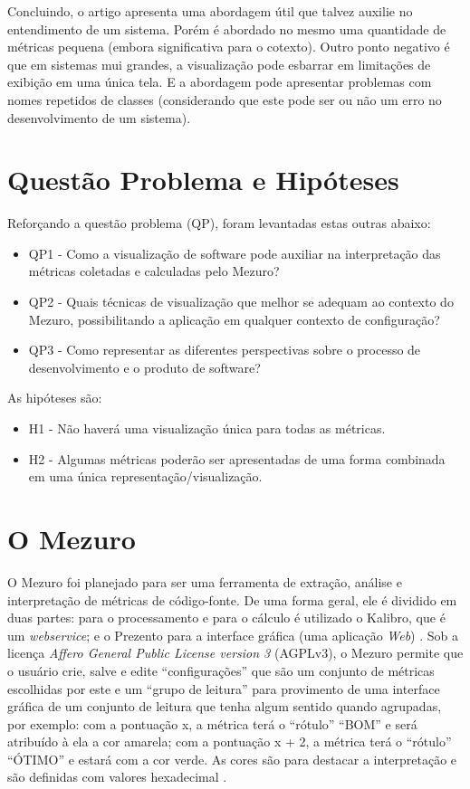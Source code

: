 Concluindo, o artigo apresenta uma abordagem útil que talvez auxilie no
entendimento de um sistema. Porém é abordado no mesmo uma quantidade de
métricas pequena (embora significativa para o cotexto). Outro ponto negativo é
que em sistemas mui grandes, a visualização pode esbarrar em limitações de
exibição em uma única tela. E a abordagem pode apresentar problemas com nomes
repetidos de classes (considerando que este pode ser ou não um erro no
desenvolvimento de um sistema).

\section{Questão Problema e Hipóteses}

Reforçando a questão problema (QP), foram levantadas estas outras abaixo:

\begin{itemize}
  \item QP1 - Como a visualização de software pode auxiliar na
  interpretação das métricas coletadas e calculadas pelo Mezuro?
  \item QP2 - Quais técnicas de visualização que melhor se adequam ao
  contexto do Mezuro, possibilitando a aplicação em qualquer contexto de
  configuração?
  \item QP3 - Como representar as diferentes perspectivas sobre o processo
  de desenvolvimento e o produto de software?
\end{itemize}

As hipóteses são:

\begin{itemize}
  \item H1 - Não haverá uma visualização única para todas as métricas.
  \item H2 - Algumas métricas poderão ser apresentadas de uma forma combinada
  em uma única representação/visualização.
\end{itemize}


\section{O Mezuro}

O Mezuro foi planejado para ser uma ferramenta de extração, análise e interpretação de
métricas de código-fonte. De uma forma geral, ele é dividido em duas partes:
para o processamento e para o cálculo é utilizado o Kalibro, que é um
\textit{webservice}; e o Prezento para a interface gráfica (uma aplicação
\textit{Web}) \cite{meirellesCibse2015}. Sob a licença
\textit{Affero General Public License version 3} (AGPLv3), o Mezuro permite que
o usuário crie, salve e edite ``configurações'' que são um conjunto de
métricas escolhidas por este e um ``grupo de leitura'' para provimento de uma
interface gráfica de um conjunto de leitura que tenha algum sentido quando
agrupadas, por exemplo: com a pontuação x, a métrica terá o ``rótulo'' ``BOM'' e
será atribuído à ela a cor amarela; com a pontuação x + 2, a métrica terá o
``rótulo'' ``ÓTIMO'' e estará com a cor verde. As cores são para destacar a
interpretação e são definidas com valores hexadecimal \cite{camarinhaOSS2015}.

